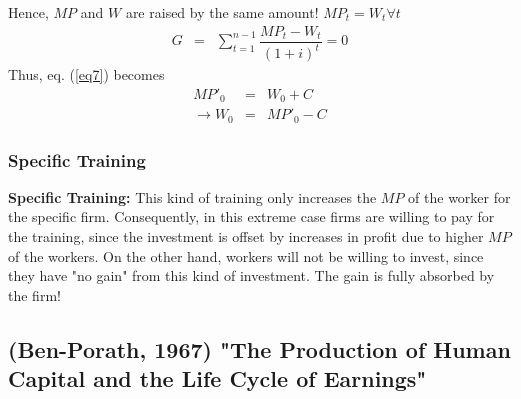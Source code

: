 \documentclass[12pt,a4paper]{article}
\begin{document}
  Hence, $MP$ and $W$ are raised by the same amount! $MP_t = W_t
  \forall t$ 
  \begin{eqnarray}
    G&=& \sum_{t=1}^{n-1} \dfrac{MP_t - W_t}{(1+i)^{t}}=0
  \end{eqnarray}
  Thus, eq. (\ref{eq7}) becomes 
  \begin{eqnarray}
    MP'_0 &=& W_0 +C \\
    \rightarrow W_0 &=& MP'_0 -C
  \end{eqnarray}
  \subsubsection{Specific Training} %
  \label{sub:Specific_Training}
  \textbf{Specific Training:} This kind of training only increases the
  $MP$ of the worker for the specific firm.
  Consequently, in this extreme case firms are willing to pay for the
  training, since the investment is offset by increases in profit due
  to higher $MP$ of the workers. On the other hand, workers will not
  be willing to invest, since they have "no gain" from this kind of
  investment. The gain is fully absorbed by the firm!

  \subsection{(Ben-Porath, 1967) "The Production of Human Capital and the Life Cycle of Earnings"} %
\end{document}
